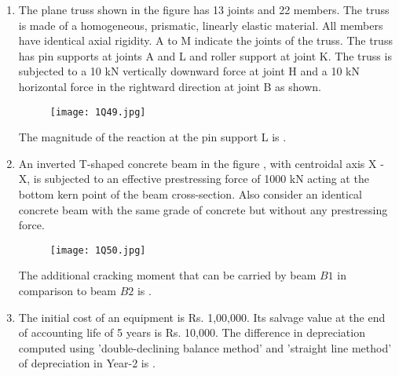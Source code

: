 \documentclass[journal,12pt,onecolumn]{article}
\theoremstyle{remark}
\begin{document}
\begin{enumerate}
    \item The plane truss shown in the figure  has 13 joints and 22 members. The truss is made of a homogeneous, prismatic, linearly elastic material. All members have identical axial rigidity. A to M indicate the joints of the truss. The truss has pin supports at joints A and L and roller support at joint K. The truss is subjected to a 10 kN vertically downward force at joint H and a 10 kN horizontal force in the rightward direction at joint B as shown.
    \begin{figure}[H]
        \centering
        \texttt{[image: 1Q49.jpg]}
        \caption{}
        \label{fig:q49}
    \end{figure}
    The magnitude of the reaction  at the pin support L is \underline{\hspace{2cm}} .
    
    \hfill{}
    
    \item An inverted T-shaped concrete beam  in the figure , with centroidal axis X - X, is subjected to an effective prestressing force of 1000 kN acting at the bottom kern point of the beam cross-section. Also consider an identical concrete beam  with the same grade of concrete but without any prestressing force.
    \begin{figure}[H]
        \centering
        \texttt{[image: 1Q50.jpg]}
        \caption{}
        \label{fig:q50}
    \end{figure}
    The additional cracking moment  that can be carried by beam $B1$ in comparison to beam $B2$ is \underline{\hspace{2cm}} .
    
    \hfill{}
    
    \item The initial cost of an equipment is Rs. 1,00,000. Its salvage value at the end of accounting life of 5 years is Rs. 10,000. The difference in depreciation  computed using 'double-declining balance method' and 'straight line method' of depreciation in Year-2 is \underline{\hspace{2cm}} .
    
    \hfill{}
    

\end{enumerate}
\end{document}
